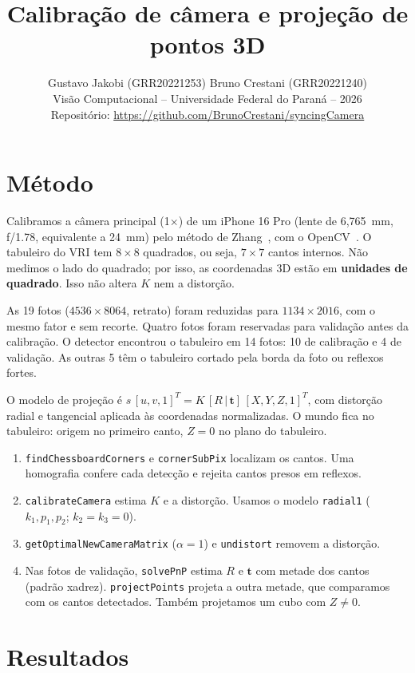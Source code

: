 \documentclass[10pt,a4paper]{article}
\title{\vspace{-1.6cm}Calibração de câmera e projeção de pontos 3D}
\author{Gustavo Jakobi (GRR20221253) \quad Bruno Crestani (GRR20221240)\\
  \small Visão Computacional -- Universidade Federal do Paraná -- 2026\\
  \small Repositório: \url{https://github.com/BrunoCrestani/syncingCamera}}
\date{\vspace{-1.2cm}}
\begin{document}
\maketitle

\section*{Método}

Calibramos a câmera principal (1$\times$) de um iPhone 16 Pro (lente de
6,765~mm, f/1.78, equivalente a 24~mm) pelo método de Zhang~\cite{zhang}, com o
OpenCV~\cite{opencv}. O tabuleiro do VRI tem $8\times8$ quadrados, ou seja,
$7\times7$ cantos internos. Não medimos o lado do quadrado; por isso, as
coordenadas 3D estão em \textbf{unidades de quadrado}. Isso não altera $K$ nem
a distorção.

As 19 fotos ($4536\times8064$, retrato) foram reduzidas para $1134\times2016$,
com o mesmo fator e sem recorte. Quatro fotos foram reservadas para validação
antes da calibração. O detector encontrou o tabuleiro em 14 fotos: 10 de
calibração e 4 de validação. As outras 5 têm o tabuleiro cortado pela borda da
foto ou reflexos fortes.

O modelo de projeção é $s\,[u, v, 1]^T = K\,[R\,|\,\mathbf{t}]\,[X, Y, Z, 1]^T$,
com distorção radial e tangencial aplicada às coordenadas normalizadas. O mundo
fica no tabuleiro: origem no primeiro canto, $Z=0$ no plano do tabuleiro.

\begin{enumerate}
  \item \texttt{findChessboardCorners} e \texttt{cornerSubPix} localizam os
    cantos. Uma homografia confere cada detecção e rejeita cantos presos em
    reflexos.
  \item \texttt{calibrateCamera} estima $K$ e a distorção. Usamos o modelo
    \texttt{radial1} ($k_1, p_1, p_2$; $k_2 = k_3 = 0$).
  \item \texttt{getOptimalNewCameraMatrix} ($\alpha = 1$) e \texttt{undistort}
    removem a distorção.
  \item Nas fotos de validação, \texttt{solvePnP} estima $R$ e $\mathbf{t}$ com
    metade dos cantos (padrão xadrez). \texttt{projectPoints} projeta a outra
    metade, que comparamos com os cantos detectados. Também projetamos um cubo
    com $Z \neq 0$.
\end{enumerate}

\section*{Resultados}
\end{document}
